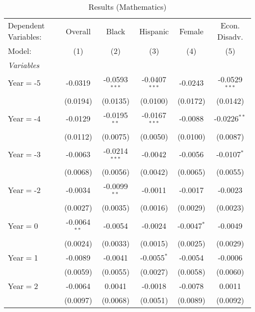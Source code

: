 
\begin{table}[htbp]
   \centering
   \caption{\label{MainResultsMath} Results (Mathematics)}
   \begin{tabular}{lccccc}
      \tabularnewline\midrule\midrule
      Dependent Variables: & Overall        & Black           & Hispanic        & Female        & Econ. Disadv.\\
      Model:               & (1)            & (2)             & (3)             & (4)           & (5)\\
      \midrule \emph{Variables} &   &   &   &   &  \\
      Year$=$-5            & -0.0319        & -0.0593$^{***}$ & -0.0407$^{***}$ & -0.0243       & -0.0529$^{***}$\\
                           & (0.0194)       & (0.0135)        & (0.0100)        & (0.0172)      & (0.0142)\\
      Year$=$-4            & -0.0129        & -0.0195$^{**}$  & -0.0167$^{***}$ & -0.0088       & -0.0226$^{**}$\\
                           & (0.0112)       & (0.0075)        & (0.0050)        & (0.0100)      & (0.0087)\\
      Year$=$-3            & -0.0063        & -0.0214$^{***}$ & -0.0042         & -0.0056       & -0.0107$^{*}$\\
                           & (0.0068)       & (0.0056)        & (0.0042)        & (0.0065)      & (0.0055)\\
      Year$=$-2            & -0.0034        & -0.0099$^{**}$  & -0.0011         & -0.0017       & -0.0023\\
                           & (0.0027)       & (0.0035)        & (0.0016)        & (0.0029)      & (0.0023)\\
      Year$=$0             & -0.0064$^{**}$ & -0.0054         & -0.0024         & -0.0047$^{*}$ & -0.0049\\
                           & (0.0024)       & (0.0033)        & (0.0015)        & (0.0025)      & (0.0029)\\
      Year$=$1             & -0.0089        & -0.0041         & -0.0055$^{*}$   & -0.0054       & -0.0006\\
                           & (0.0059)       & (0.0055)        & (0.0027)        & (0.0058)      & (0.0060)\\
      Year$=$2             & -0.0064        & 0.0041          & -0.0018         & -0.0078       & 0.0011\\
                           & (0.0097)       & (0.0068)        & (0.0051)        & (0.0089)      & (0.0092)\\

\end{tabular}
\end{table}
